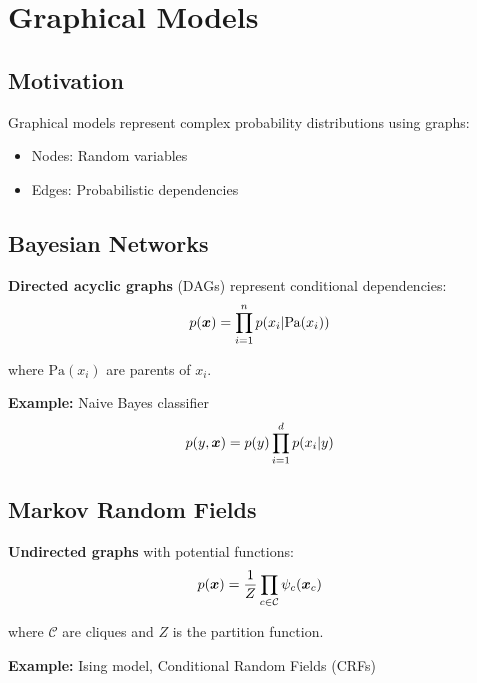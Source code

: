 
\section{Graphical Models}
\label{sec:graphical-models}

\subsection{Motivation}

Graphical models represent complex probability distributions using graphs:
\begin{itemize}
    \item Nodes: Random variables
    \item Edges: Probabilistic dependencies
\end{itemize}

\subsection{Bayesian Networks}

\textbf{Directed acyclic graphs} (DAGs) represent conditional dependencies:
\begin{equation}
p(\boldsymbol{x}) = \prod_{i=1}^{n} p(x_i | \text{Pa}(x_i))
\end{equation}

where $\text{Pa}(x_i)$ are parents of $x_i$.

\textbf{Example:} Naive Bayes classifier
\begin{equation}
p(y, \boldsymbol{x}) = p(y) \prod_{i=1}^{d} p(x_i|y)
\end{equation}

\subsection{Markov Random Fields}

\textbf{Undirected graphs} with potential functions:
\begin{equation}
p(\boldsymbol{x}) = \frac{1}{Z} \prod_{c \in \mathcal{C}} \psi_c(\boldsymbol{x}_c)
\end{equation}

where $\mathcal{C}$ are cliques and $Z$ is the partition function.

\textbf{Example:} Ising model, Conditional Random Fields (CRFs)

